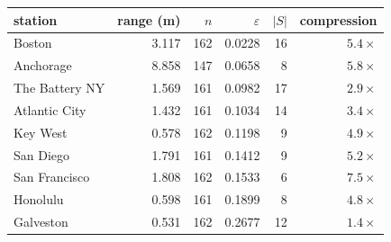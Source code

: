 \begin{tabular}{lrrrrr}
\toprule
station & range (m) & $n$ & $\varepsilon$ & $|S|$ & compression \\
\midrule
Boston & 3.117 & 162 & 0.0228 & 16 & $5.4\times$ \\
Anchorage & 8.858 & 147 & 0.0658 & 8 & $5.8\times$ \\
The Battery NY & 1.569 & 161 & 0.0982 & 17 & $2.9\times$ \\
Atlantic City & 1.432 & 161 & 0.1034 & 14 & $3.4\times$ \\
Key West & 0.578 & 162 & 0.1198 & 9 & $4.9\times$ \\
San Diego & 1.791 & 161 & 0.1412 & 9 & $5.2\times$ \\
San Francisco & 1.808 & 162 & 0.1533 & 6 & $7.5\times$ \\
Honolulu & 0.598 & 161 & 0.1899 & 8 & $4.8\times$ \\
Galveston & 0.531 & 162 & 0.2677 & 12 & $1.4\times$ \\
\bottomrule
\end{tabular}
